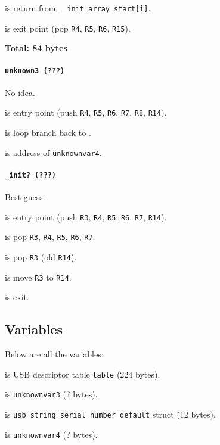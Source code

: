  is return from \texttt{\_\_init\_array\_start[i]}.

 is exit point (pop \texttt{R4}, \texttt{R5},
\texttt{R6}, \texttt{R15}).

\textbf{Total: 84 bytes}

\paragraph{\texttt{unknown3 (???)}} No idea.

 is entry point (push \texttt{R4}, \texttt{R5},
\texttt{R6}, \texttt{R7}, \texttt{R8}, \texttt{R14}).

 is loop branch back to .

 is address of \texttt{unknownvar4}.

\paragraph{\texttt{\_init? (???)}} Best guess.

 is entry point (push \texttt{R3}, \texttt{R4},
\texttt{R5}, \texttt{R6}, \texttt{R7}, \texttt{R14}).

 is pop \texttt{R3}, \texttt{R4}, \texttt{R5},
\texttt{R6}, \texttt{R7}.

 is pop \texttt{R3} (old \texttt{R14}).

 is move \texttt{R3} to \texttt{R14}.

 is exit.

\subsection{Variables}

Below are all the variables:

\vspace{1em}

 is USB descriptor table \texttt{table} (224 bytes).

 is \texttt{unknownvar3} (? bytes).

 is {\tiny
\texttt{usb\_string\_serial\_number\_default}} struct (12 bytes).

 is \texttt{unknownvar4} (? bytes).

